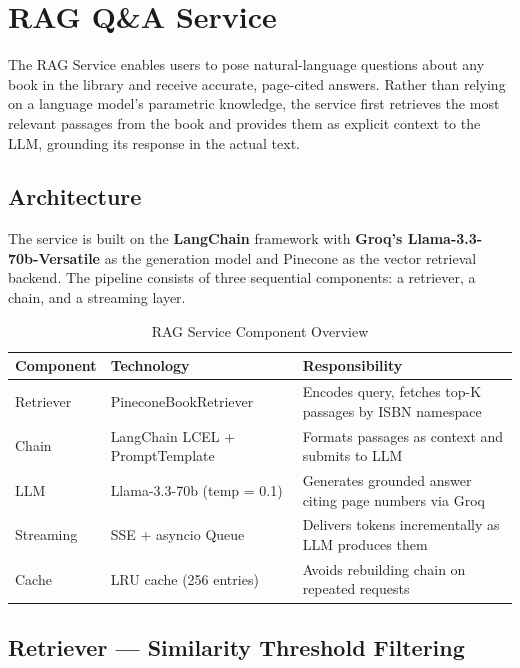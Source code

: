 \section{RAG Q\&A Service}
\label{sec:ragservice}

The RAG Service enables users to pose natural-language questions about any book
in the library and receive accurate, page-cited answers. Rather than relying on
a language model's parametric knowledge, the service first retrieves the most
relevant passages from the book and provides them as explicit context to the
LLM, grounding its response in the actual text.

\subsection{Architecture}

The service is built on the \textbf{LangChain} framework with
\textbf{Groq's Llama-3.3-70b-Versatile} as the generation model and Pinecone
as the vector retrieval backend. The pipeline consists of three sequential
components: a retriever, a chain, and a streaming layer.

\begin{table}[H]
\centering
\caption{RAG Service Component Overview}
\label{tab:ragcomponents}
\begin{tabularx}{\textwidth}{|l|l|X|}
\hline
\textbf{Component} & \textbf{Technology} & \textbf{Responsibility} \\
\hline
Retriever & PineconeBookRetriever & Encodes query, fetches top-K passages by ISBN namespace \\
\hline
Chain     & LangChain LCEL + PromptTemplate & Formats passages as context and submits to LLM \\
\hline
LLM       & Llama-3.3-70b (temp = 0.1) & Generates grounded answer citing page numbers via Groq \\
\hline
Streaming & SSE + asyncio Queue & Delivers tokens incrementally as LLM produces them \\
\hline
Cache     & LRU cache (256 entries) & Avoids rebuilding chain on repeated requests \\
\hline
\end{tabularx}
\end{table}
\subsection{Retriever --- Similarity Threshold Filtering}

